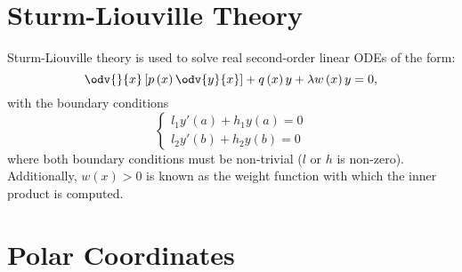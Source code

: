 \documentclass{article}
\begin{document}
\section{Sturm-Liouville Theory}
Sturm-Liouville theory is used to solve real second-order linear ODEs of the form:
\begin{equation*}
    \odv{}{x} \left[ p\left( x \right) \odv{y}{x} \right] + q\left( x \right) y + \lambda w\left( x \right) y = 0,
\end{equation*}
with the boundary conditions
\begin{equation*}
    \begin{cases*}
        l_1 y'\left( a \right) + h_1 y\left( a \right) = 0 \\
        l_2 y'\left( b \right) + h_2 y\left( b \right) = 0
    \end{cases*}
\end{equation*}
where both boundary conditions must be non-trivial (\(l\) or \(h\) is non-zero). Additionally,
\(w\left( x \right) > 0\) is known as the weight function with which the inner product is computed.
\section{Polar Coordinates}
\end{document}
